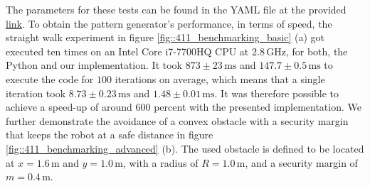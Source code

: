 The parameters for these tests can be found in the YAML file at the provided \href{https://github.com/mhubii/nmpc_pattern_generator/blob/719fde0bb73925923de85cbf379c5523e075dfeb/libs/pattern_generator/configs_hrp2.yaml#L1}{\underline{link}}. To obtain the pattern generator's performance, in terms of speed, the straight walk experiment in figure \ref{fig::411_benchmarking_basic} (a) got executed ten times on an Intel Core i7-7700HQ CPU at $2.8\,\text{GHz}$, for both, the Python and our implementation. It took $873\pm23\,\text{ms}$ and $147.7\pm0.5\,\text{ms}$ to execute the code for $100$ iterations on average, which means that a single iteration took $8.73\pm0.23\,\text{ms}$ and $1.48\pm0.01\,\text{ms}$. It was therefore possible to achieve a speed-up of around $600$ percent with the presented implementation. We further demonstrate the avoidance of a convex obstacle with a security margin that keeps the robot at a safe distance in figure \ref{fig::411_benchmarking_advanced} (b). The used obstacle is defined to be located at $x=1.6\,\text{m}$ and $y=1.0\,\text{m}$, with a radius of $R=1.0\,\text{m}$, and a security margin of $m=0.4\,\text{m}$.
